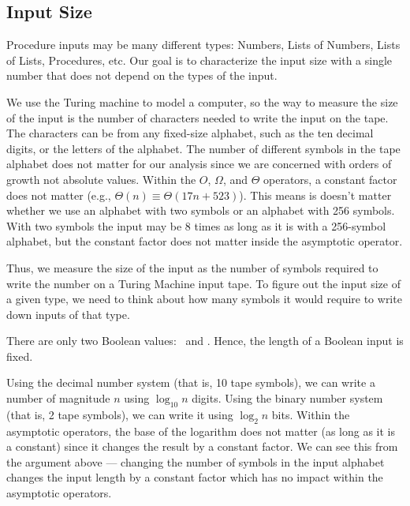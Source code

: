 \begin{schemeregion}
\subsection{Input Size}\label{sec:inputsize}

Procedure inputs may be many different types: Numbers, Lists of Numbers, Lists of Lists, Procedures, etc.  Our goal is to characterize the input size with a single number that does not depend on the types of the input.

We use the Turing machine to model a computer, so the way to measure the size of the input is the number of characters needed to write the input on the tape.  The characters can be from any fixed-size alphabet, such as the ten decimal digits, or the letters of the alphabet.  %
The number of different symbols in the tape alphabet does not matter for our analysis since we are concerned with orders of growth not absolute values.  Within the $O$, $\Omega$, and $\Theta$ operators, a constant factor does not matter (e.g., $\Theta(n) \equiv \Theta(17n+523)$).  This means is doesn't matter whether we use an alphabet with two symbols or an alphabet with 256 symbols.  With two symbols the input may be 8 times as long as it is with a 256-symbol alphabet, but the constant factor does not matter inside the asymptotic operator.

Thus, we measure the size of the input as the number of symbols required to write the number on a Turing Machine input tape.  To figure out the input size of a given type, we need to think about how many symbols it would require to write down inputs of that type.

 There are only two Boolean values: \true\ and \false.  Hence, the length of a Boolean input is fixed.

 Using the decimal number system (that is, 10 tape symbols), we can write a number of magnitude $n$ using $\log_{10} n$ digits.  Using the binary number system (that is, 2 tape symbols), we can write it using $\log_{2} n$ bits.  Within the asymptotic operators, the base of the logarithm does not matter (as long as it is a constant) since it changes the result by a constant factor.  We can see this from the argument above --- changing the number of symbols in the input alphabet changes the input length by a constant factor which has no impact within the asymptotic operators.  


\end{schemeregion}
